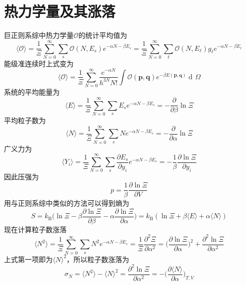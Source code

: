 \documentclass[UTF8,oneside,openany]{ctexbook}
\DeclareMathOperator\dif{d\!}
\newcommand\aver[1]{\langle#1\rangle}
\newcommand\kb{k_{\text{B}}}
\begin{document}
\section{热力学量及其涨落}
巨正则系综中热力学量$\mathcal{O}$的统计平均值为
\begin{equation}
\aver{\mathcal{O}}=\frac{1}{\Xi}\sum_{N=0}^{\infty}\sum_{s}\mathcal{O}(N,E_s)e^{-\alpha N-\beta E_s}=\frac{1}{\Xi}\sum_{N=0}^{\infty}\sum_{\ell}\mathcal{O}(N,E_{\ell})g_{\ell}e^{-\alpha N-\beta E_{\ell}}
\end{equation}
能级准连续时上式变为
\begin{equation}
\aver{\mathcal{O}}=\frac{1}{\Xi}\sum_{N=0}^{\infty}\frac{e^{-\alpha N}}{h^{3N}N!}\int\mathcal{O}(\pmb{p},\pmb{q})e^{-\beta E(\pmb{p},\pmb{q})}\dif\Omega
\end{equation}
系统的平均能量为
\begin{equation}
\aver{E}=\frac{1}{\Xi}\sum_{N=0}^{\infty}\sum_{s}E_se^{-\alpha N-\beta E_s}=-\frac{\partial}{\partial\beta}\ln\Xi
\end{equation}
平均粒子数为
\begin{equation}\label{lizishu}
\aver{N}=\frac{1}{\Xi}\sum_{N=0}^{\infty}\sum_{s}Ne^{-\alpha N-\beta E_s}=-\frac{\partial}{\partial\alpha}\ln\Xi
\end{equation}
广义力为
\begin{equation}
\aver{Y_i}=\frac{1}{\Xi}\sum_{N=0}^{\infty}\sum_{s}\frac{\partial E_s}{\partial y_i}e^{-\alpha N-\beta E_s}=-\frac{1}{\beta}\frac{\partial\ln\Xi}{\partial y_i}
\end{equation}
因此压强为
\begin{equation}
p=\frac{1}{\beta}\frac{\partial\ln\Xi}{\partial V}
\end{equation}
用与正则系综中类似的方法可以得到熵为
\begin{equation}
S=\kb\biggl(\ln\Xi-\beta\frac{\partial\ln\Xi}{\partial\beta}-\alpha\frac{\partial\ln\Xi}{\partial\alpha}\biggr)=\kb(\ln\Xi+\beta\aver{E}+\alpha\aver{N})
\end{equation}
现在计算粒子数涨落
\begin{equation}
\aver{N^2}=\frac{1}{\Xi}\sum_{N=0}^{\infty}\sum_sN^2e^{-\alpha N-\beta E_s}=\frac{1}{\Xi}\frac{\partial^2\Xi}{\partial\alpha^2}=\biggl(\frac{\partial\ln\Xi}{\partial\alpha}\biggr)^2+\frac{\partial^2\ln\Xi}{\partial\alpha^2}
\end{equation}
上式第一项即为$\aver{N}^2$，所以粒子数涨落为
\begin{equation}
\sigma_N=\aver{N^2}-\aver{N}^2=\frac{\partial^2\ln\Xi}{\partial\alpha^2}=-\biggl(\frac{\partial\aver{N}}{\partial\alpha}\biggr)_{T,V}
\end{equation}
\end{document}
